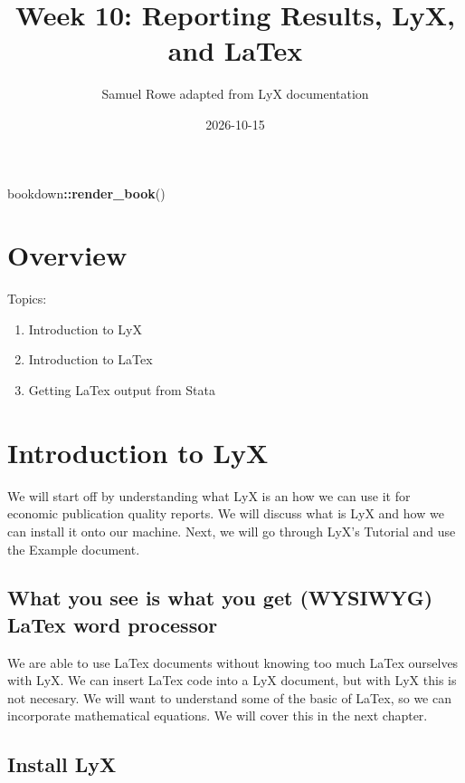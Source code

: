 \documentclass[
]{book}
\title{Week 10: Reporting Results, LyX, and LaTex}
\author{Samuel Rowe adapted from LyX documentation}
\date{2026-10-15}
\newenvironment{Shaded}{\begin{snugshade}}{\end{snugshade}}
\newcommand{\FunctionTok}[1]{\textcolor[rgb]{0.13,0.29,0.53}{\textbf{#1}}}
\newcommand{\NormalTok}[1]{#1}
\newcommand{\SpecialCharTok}[1]{\textcolor[rgb]{0.81,0.36,0.00}{\textbf{#1}}}
\providecommand{\tightlist}{%
  \setlength{\itemsep}{0pt}\setlength{\parskip}{0pt}}
\begin{document}
\maketitle

{
\setcounter{tocdepth}{1}
\tableofcontents
}
\begin{Shaded}
\begin{Highlighting}[]
\NormalTok{bookdown}\SpecialCharTok{::}\FunctionTok{render\_book}\NormalTok{()}
\end{Highlighting}
\end{Shaded}

\chapter*{Overview}\label{overview}

Topics:

\begin{enumerate}
\def\labelenumi{\arabic{enumi}.}
\tightlist
\item
  Introduction to LyX
\item
  Introduction to LaTex
\item
  Getting LaTex output from Stata
\end{enumerate}

\chapter{Introduction to LyX}\label{introduction-to-lyx}

We will start off by understanding what LyX is an how we can use it for economic publication quality reports. We will discuss what is LyX and how we can install it onto our machine. Next, we will go through LyX's Tutorial and use the Example document.

\section{What you see is what you get (WYSIWYG) LaTex word processor}\label{what-you-see-is-what-you-get-wysiwyg-latex-word-processor}

We are able to use LaTex documents without knowing too much LaTex ourselves with LyX. We can insert LaTex code into a LyX document, but with LyX this is not necesary. We will want to understand some of the basic of LaTex, so we can incorporate mathematical equations. We will cover this in the next chapter.

\section{Install LyX}\label{install-lyx}
\end{document}
